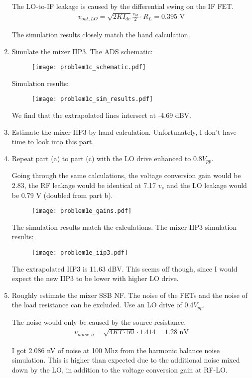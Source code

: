 \begin{enumerate}[label=(\alph*)]
    The LO-to-IF leakage is caused by the differential swing on the IF FET.
    \begin{align*}
        v_{out,LO} = \sqrt{2 K I_{dc}} \frac{v_{id}}{2} \cdot R_L = 0.395 \text{ V}
    \end{align*}

    The simulation results closely match the hand calculation.

    \item {\color{blue} Simulate the mixer IIP3.}
    The ADS schematic:
    \begin{figure}[H]
        \centering \texttt{[image: problem1c\_schematic.pdf]}
    \end{figure}

    Simulation results:
    \begin{figure}[H]
        \centering \texttt{[image: problem1c\_sim\_results.pdf]}
    \end{figure}

    We find that the extrapolated lines intersect at -4.69 dBV.

    \item {\color{blue} Estimate the mixer IIP3 by hand calculation.}
    Unfortunately, I don't have time to look into this part.

    \item {\color{blue} Repeat part (a) to part (c) with the LO drive enhanced to 0.8$V_{pp}$.}

    Going through the same calculations, the voltage conversion gain would be 2.83, the RF leakage would be identical at 7.17 $v_s$ and the LO leakage would be 0.79 V (doubled from part b).
    \begin{figure}[H]
        \centering \texttt{[image: problem1e\_gains.pdf]}
    \end{figure}

    The simulation results match the calculations. The mixer IIP3 simulation results:
    \begin{figure}[H]
        \centering \texttt{[image: problem1e\_iip3.pdf]}
    \end{figure}

    The extrapolated IIP3 is 11.63 dBV. This seems off though, since I would expect the new IIP3 to be lower with higher LO drive.

    \item {\color{blue} Roughly estimate the mixer SSB NF. The noise of the FETs and the noise of the load resistance can be excluded. Use an LO drive of 0.4$V_{pp}$.}

    The noise would only be caused by the source resistance.
    \begin{align*}
        v_{noise,o} = \sqrt{4 K T \cdot 50} \cdot 1.414 = 1.28 \text{ nV}
    \end{align*}

    I got 2.086 nV of noise at 100 Mhz from the harmonic balance noise simulation. This is higher than expected due to the additional noise mixed down by the LO, in addition to the voltage conversion gain at RF-LO.
\end{enumerate}


